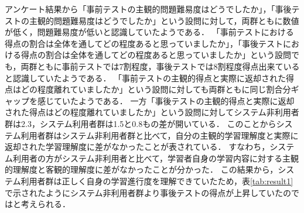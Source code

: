 アンケート結果から「事前テストの主観的問題難易度はどうでしたか」，「事後テストの主観的問題難易度はどうでしたか」という設問に対して，両群ともに数値が低く，問題難易度が低いと認識していたようである．
「事前テストにおける得点の割合は全体を通してどの程度あると思っていましたか」，「事後テストにおける得点の割合は全体を通してどの程度あると思っていましたか」という設問でも，両群ともに事前テストでは7割程度，事後テストでは8割程度得点出来ていると認識していたようである．
「事前テストの主観的得点と実際に返却された得点はどの程度離れていましたか」という設問に対しても両群ともに同じ割合分ギャップを感じていたようである．
一方「事後テストの主観的得点と実際に返却された得点はどの程度離れていましたか」という設問に対してシステム非利用者群は2.3，システム利用者群は1.5と0.8もの差が開いている．
このことからシステム利用者群はシステム非利用者群と比べて，自分の主観的学習理解度と実際に返却された学習理解度に差がなかったことが表されている．
すなわち，システム利用者の方がシステム非利用者と比べて，学習者自身の学習内容に対する主観的理解度と客観的理解度に差がなかったことが分かった．
この結果から，システム利用者群は正しく自身の学習進行度を理解できていたため，表\ref{tab:result1}で示されたようにシステム非利用者群より事後テストの得点が上昇していたのではと考えられる．